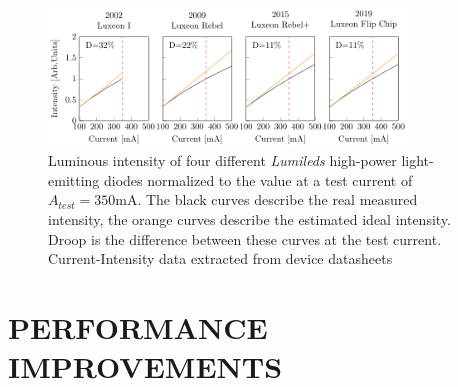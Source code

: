 \documentclass[a4paper,nocompress]{spie}  %
\begin{document}
\begin{figure} [ht]
    \begin{center}
        \includegraphics[width=0.85\textwidth]{SPIE/article/droop_lumileds.pdf}
    \end{center}
    \caption{Luminous intensity of four different \textit{Lumileds} high-power light-emitting diodes normalized to the value at a test current of $A_{test}=350$mA. The black curves describe the real measured intensity, the orange curves describe the estimated ideal intensity. Droop is the difference between these curves at the test current. Current-Intensity data extracted from device datasheets \cite{datasheet_lumileds_lux1}\cite{datasheet_lumileds_rebel}\cite{datasheet_lumileds_rebplus}\cite{lumi2019data}}
    \label{fig:chip_arch}
\end{figure}

\section{PERFORMANCE IMPROVEMENTS}
\end{document}
